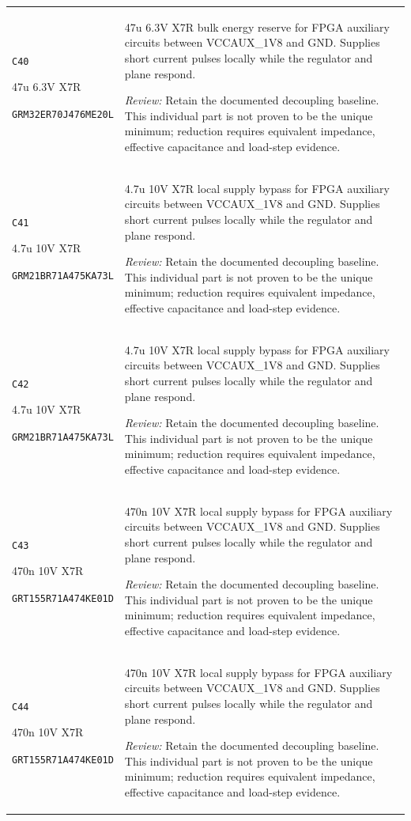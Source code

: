 \documentclass[10pt,a4paper]{article}
\begin{document}
\begin{longtable}{@{}P{46mm}P{117mm}@{}}
\nolinkurl{C40}\par 47u 6.3V X7R\par\scriptsize \nolinkurl{GRM32ER70J476ME20L} & 47u 6.3V X7R bulk energy reserve for FPGA auxiliary circuits between VCCAUX\_1V8 and GND. Supplies short current pulses locally while the regulator and plane respond.\par\smallskip\textit{Review:} Retain the documented decoupling baseline. This individual part is not proven to be the unique minimum; reduction requires equivalent impedance, effective capacitance and load-step evidence. \\
\nolinkurl{C41}\par 4.7u 10V X7R\par\scriptsize \nolinkurl{GRM21BR71A475KA73L} & 4.7u 10V X7R local supply bypass for FPGA auxiliary circuits between VCCAUX\_1V8 and GND. Supplies short current pulses locally while the regulator and plane respond.\par\smallskip\textit{Review:} Retain the documented decoupling baseline. This individual part is not proven to be the unique minimum; reduction requires equivalent impedance, effective capacitance and load-step evidence. \\
\nolinkurl{C42}\par 4.7u 10V X7R\par\scriptsize \nolinkurl{GRM21BR71A475KA73L} & 4.7u 10V X7R local supply bypass for FPGA auxiliary circuits between VCCAUX\_1V8 and GND. Supplies short current pulses locally while the regulator and plane respond.\par\smallskip\textit{Review:} Retain the documented decoupling baseline. This individual part is not proven to be the unique minimum; reduction requires equivalent impedance, effective capacitance and load-step evidence. \\
\nolinkurl{C43}\par 470n 10V X7R\par\scriptsize \nolinkurl{GRT155R71A474KE01D} & 470n 10V X7R local supply bypass for FPGA auxiliary circuits between VCCAUX\_1V8 and GND. Supplies short current pulses locally while the regulator and plane respond.\par\smallskip\textit{Review:} Retain the documented decoupling baseline. This individual part is not proven to be the unique minimum; reduction requires equivalent impedance, effective capacitance and load-step evidence. \\
\nolinkurl{C44}\par 470n 10V X7R\par\scriptsize \nolinkurl{GRT155R71A474KE01D} & 470n 10V X7R local supply bypass for FPGA auxiliary circuits between VCCAUX\_1V8 and GND. Supplies short current pulses locally while the regulator and plane respond.\par\smallskip\textit{Review:} Retain the documented decoupling baseline. This individual part is not proven to be the unique minimum; reduction requires equivalent impedance, effective capacitance and load-step evidence. \\

\end{longtable}
\end{document}
